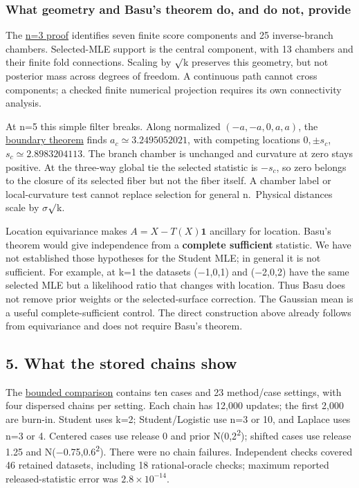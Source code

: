\documentclass[
  10pt,
]{article}
\begin{document}
\subsubsection{What geometry and Basu's theorem do, and do not,
provide}\label{what-geometry-and-basus-theorem-do-and-do-not-provide}

The \href{student_n3_geometry_selected_mle.md}{n=3 proof} identifies
seven finite score components and 25 inverse-branch chambers.
Selected-MLE support is the central component, with 13 chambers and
their finite fold connections. Scaling by \ensuremath{\surd}k preserves this geometry,
but not posterior mass across degrees of freedom. A continuous path
cannot cross components; a checked finite numerical projection requires
its own connectivity analysis.

At n=5 this simple filter breaks. Along normalized \((-a,-a,0,a,a)\),
the \href{student_n5_selection_boundary.md}{boundary theorem} finds
\(a_c\simeq3.2495052021\), with competing locations \(0,\pm s_c\),
\(s_c\simeq2.8983204113\). The branch chamber is unchanged and curvature
at zero stays positive. At the three-way global tie the selected
statistic is \(-s_c\), so zero belongs to the closure of its selected
fiber but not the fiber itself. A chamber label or local-curvature test
cannot replace selection for general n.~Physical distances scale by \ensuremath{\sigma}\ensuremath{\surd}k.

Location equivariance makes \(A=X-T(X)\mathbf1\) ancillary for location.
Basu's theorem would give independence from a \textbf{complete
sufficient} statistic. We have not established those hypotheses for the
Student MLE; in general it is not sufficient. For example, at k=1 the
datasets (\ensuremath{-}1,0,1) and (\ensuremath{-}2,0,2) have the same selected MLE but a
likelihood ratio that changes with location. Thus Basu does not remove
prior weights or the selected-surface correction. The Gaussian mean is a
useful complete-sufficient control. The direct construction above
already follows from equivariance and does not require Basu's theorem.

\subsection{5. What the stored chains
show}\label{what-the-stored-chains-show}

The \href{location_only_performance_comparison.md}{bounded comparison}
contains ten cases and 23 method/case settings, with four dispersed
chains per setting. Each chain has 12,000 updates; the first 2,000 are
burn-in. Student uses k=2; Student/Logistic use n=3 or 10, and Laplace
uses n=3 or 4. Centered cases use release 0 and prior N(0,2\textsuperscript{2}); shifted
cases use release 1.25 and N(\ensuremath{-}0.75,0.6\textsuperscript{2}). There were no chain failures.
Independent checks covered 46 retained datasets, including 18
rational-oracle checks; maximum reported released-statistic error was
\(2.8\times10^{-14}\).
\end{document}

